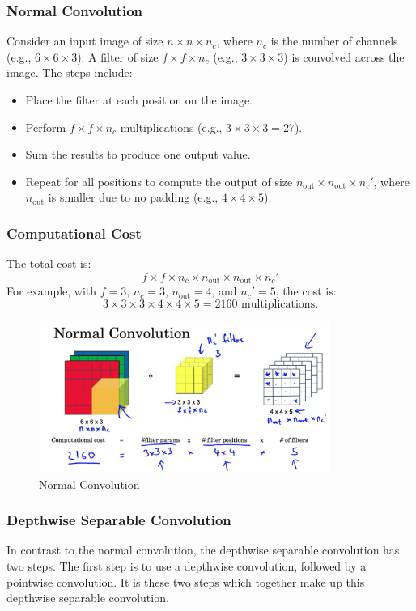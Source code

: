 \documentclass[letterpaper,12pt,notitlepage,twoside]{report}
\begin{document}
\subsubsection*{Normal Convolution}
Consider an input image of size $n \times n \times n_c$, where $n_c$ is the number of channels (e.g., $6 \times 6 \times 3$). A filter of size $f \times f \times n_c$ (e.g., $3 \times 3 \times 3$) is convolved across the image. The steps include:
\begin{itemize}[nosep]
    \item Place the filter at each position on the image.
    \item Perform $f \times f \times n_c$ multiplications (e.g., $3 \times 3 \times 3 = 27$).
    \item Sum the results to produce one output value.
    \item Repeat for all positions to compute the output of size $n_{\text{out}} \times n_{\text{out}} \times n_c'$, where $n_{\text{out}}$ is smaller due to no padding (e.g., $4 \times 4 \times 5$).
\end{itemize}

\subsubsection*{Computational Cost}
The total cost is:
\[
f \times f \times n_c \times n_{\text{out}} \times n_{\text{out}} \times n_c'
\]
For example, with $f = 3$, $n_c = 3$, $n_{\text{out}} = 4$, and $n_c' = 5$, the cost is:
\[
3 \times 3 \times 3 \times 4 \times 4 \times 5 = 2160 \text{ multiplications.}
\]

\begin{figure}[h]
	\centering
	\includegraphics[width=0.85\textwidth]{Images/Normal Convolution.png}
	\caption{Normal Convolution}
	\label{fig:39}
\end{figure}
\FloatBarrier

\subsubsection*{Depthwise Separable Convolution}
In contrast to the normal convolution, the depthwise separable convolution has two steps. The first step is to use a depthwise convolution, followed by a pointwise convolution. It is these two steps which together make up this depthwise separable convolution. 
\end{document}
